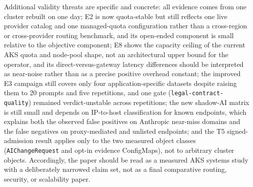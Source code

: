 Additional validity threats are specific and concrete: all evidence comes from one cluster rebuilt on one day; E2 is now quota-stable but still reflects one live provider catalog and one managed-quota configuration rather than a cross-region or cross-provider routing benchmark, and its open-ended component is small relative to the objective component; E8 shows the capacity ceiling of the current AKS quota and node-pool shape, not an architectural upper bound for the operator, and its direct-versus-gateway latency differences should be interpreted as near-noise rather than as a precise positive overhead constant; the improved E3 campaign still covers only four application-specific datasets despite raising them to 20 prompts and five repetitions, and one gate (\texttt{legal-contract-quality}) remained verdict-unstable across repetitions; the new shadow-AI matrix is still small and depends on IP-to-host classification for known endpoints, which explains both the observed false positives on Anthropic near-miss domains and the false negatives on proxy-mediated and unlisted endpoints; and the T5 signed-admission result applies only to the two measured object classes (\texttt{AIChangeRequest} and opt-in evidence ConfigMaps), not to arbitrary cluster objects. Accordingly, the paper should be read as a measured AKS systems study with a deliberately narrowed claim set, not as a final comparative routing, security, or scalability paper.
